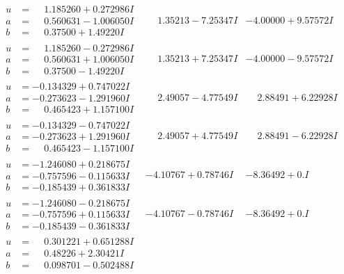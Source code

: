 \documentclass[1p]{elsarticle_modified}
\theoremstyle{definition}
\begin{document}
$$\begin{array}{c|c|c}
\begin{aligned}
u &= \phantom{-}1.185260 + 0.272986 I \\
a &= \phantom{-}0.560631 - 1.006050 I \\
b &= \phantom{-}0.37500 + 1.49220 I\end{aligned}
 & \phantom{-}1.35213 - 7.25347 I & -4.00000 + 9.57572 I \\ \hline\begin{aligned}
u &= \phantom{-}1.185260 - 0.272986 I \\
a &= \phantom{-}0.560631 + 1.006050 I \\
b &= \phantom{-}0.37500 - 1.49220 I\end{aligned}
 & \phantom{-}1.35213 + 7.25347 I & -4.00000 - 9.57572 I \\ \hline\begin{aligned}
u &= -0.134329 + 0.747022 I \\
a &= -0.273623 - 1.291960 I \\
b &= \phantom{-}0.465423 + 1.157100 I\end{aligned}
 & \phantom{-}2.49057 - 4.77549 I & \phantom{-}2.88491 + 6.22928 I \\ \hline\begin{aligned}
u &= -0.134329 - 0.747022 I \\
a &= -0.273623 + 1.291960 I \\
b &= \phantom{-}0.465423 - 1.157100 I\end{aligned}
 & \phantom{-}2.49057 + 4.77549 I & \phantom{-}2.88491 - 6.22928 I \\ \hline\begin{aligned}
u &= -1.246080 + 0.218675 I \\
a &= -0.757596 - 0.115633 I \\
b &= -0.185439 + 0.361833 I\end{aligned}
 & -4.10767 + 0.78746 I & -8.36492 + 0. I\phantom{ +0.000000I} \\ \hline\begin{aligned}
u &= -1.246080 - 0.218675 I \\
a &= -0.757596 + 0.115633 I \\
b &= -0.185439 - 0.361833 I\end{aligned}
 & -4.10767 - 0.78746 I & -8.36492 + 0. I\phantom{ +0.000000I} \\ \hline\begin{aligned}
u &= \phantom{-}0.301221 + 0.651288 I \\
a &= \phantom{-}0.48226 + 2.30421 I \\
b &= \phantom{-}0.098701 - 0.502488 I\end{aligned}

\end{array}$$
\end{document}
